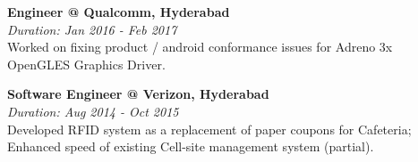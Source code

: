 \textbf{Engineer @ Qualcomm, Hyderabad} \\
\emph{Duration: Jan 2016 - Feb 2017} \\
Worked on fixing product / android conformance issues for Adreno 3x OpenGLES Graphics Driver.

\noindent
\textbf{Software Engineer @ Verizon, Hyderabad} \\
\emph{Duration: Aug 2014 - Oct 2015} \\
Developed RFID system as a replacement of paper coupons for Cafeteria; \\
Enhanced speed of existing Cell-site management system (partial).

